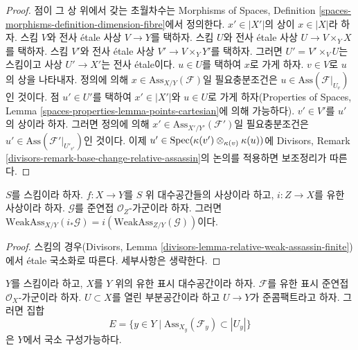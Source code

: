 \begin{proof}
점이 그 상 위에서 갖는 초월차수는 Morphisms of Spaces, Definition
\ref{spaces-morphisms-definition-dimension-fibre}에서 정의한다.
$x' \in |X'|$의 상이 $x \in |X|$라 하자. 스킴 $V$와 전사 \'etale 사상
$V \to Y$를 택하자. 스킴 $U$와 전사 \'etale 사상
$U \to V \times_Y X$를 택하자. 스킴 $V'$와 전사 \'etale 사상
$V' \to V \times_Y Y'$를 택하자. 그러면
$U' = V' \times_V U$는 스킴이고 사상 $U' \to X'$는 전사 \'etale이다.
$u \in U$를 택하여 $x$로 가게 하자. $v \in V$로 $u$의 상을 나타내자.
정의에 의해 $x \in \text{Ass}_{X/Y}(\mathcal{F})$일 필요충분조건은
$u \in \text{Ass}(\mathcal{F}|_{U_v})$인 것이다. 점 $u' \in U'$를
택하여 $x' \in |X'|$와 $u \in U$로 가게 하자(Properties of Spaces,
Lemma \ref{spaces-properties-lemma-points-cartesian}에 의해 가능하다).
$v' \in V'$를 $u'$의 상이라 하자. 그러면 정의에 의해
$x' \in \text{Ass}_{X'/Y'}(\mathcal{F}')$일 필요충분조건은
$u' \in \text{Ass}(\mathcal{F}'|_{U'_{v'}})$인 것이다.
이제 $u' \in \mathop{\mathrm{Spec}}(\kappa(v') \otimes_{\kappa(v)} \kappa(u))$에
Divisors, Remark
\ref{divisors-remark-base-change-relative-assassin}의 논의를 적용하면
보조정리가 따른다.
\end{proof}

\begin{lemma}
\label{lemma-relative-weak-assassin-finite}
$S$를 스킴이라 하자. $f : X \to Y$를 $S$ 위 대수공간들의 사상이라 하고,
$i : Z \to X$를 유한 사상이라 하자. $\mathcal{G}$를 준연접
$\mathcal{O}_Z$-가군이라 하자. 그러면
$\text{WeakAss}_{X/Y}(i_*\mathcal{G}) =
i(\text{WeakAss}_{Z/Y}(\mathcal{G}))$이다.
\end{lemma}

\begin{proof}
스킴의 경우(Divisors, Lemma
\ref{divisors-lemma-relative-weak-assassin-finite})에서 \'etale 국소화로
따른다. 세부사항은 생략한다.
\end{proof}

\begin{lemma}
\label{lemma-relative-assassin-constructible}
$Y$를 스킴이라 하고, $X$를 $Y$ 위의 유한 표시 대수공간이라 하자.
$\mathcal{F}$를 유한 표시 준연접 $\mathcal{O}_X$-가군이라 하자.
$U \subset X$를 열린 부분공간이라 하고 $U \to Y$가 준콤팩트라고 하자.
그러면 집합
$$
E = \{y \in Y \mid \text{Ass}_{X_y}(\mathcal{F}_y) \subset |U_y|\}
$$
은 $Y$에서 국소 구성가능하다.
\end{lemma}


